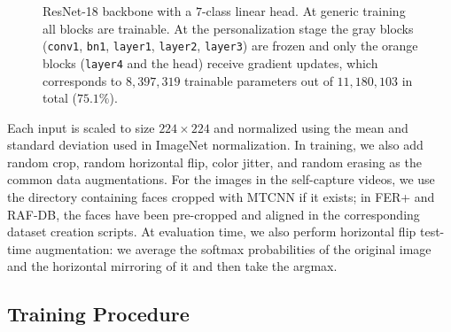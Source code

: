 \documentclass[12pt,a4paper]{article}
\begin{document}
\begin{figure}[H]
  \centering
  \caption{\footnotesize ResNet-18 backbone with a $7$-class linear head. At
  generic training all blocks are trainable. At the
  personalization stage the gray blocks
  (\texttt{conv1}, \texttt{bn1}, \texttt{layer1},
  \texttt{layer2}, \texttt{layer3}) are frozen and only the
  orange blocks (\texttt{layer4} and the head) receive gradient
  updates, which corresponds to $8{,}397{,}319$ trainable
  parameters out of $11{,}180{,}103$ in total ($75.1\%$).}
  \label{fig:arch}
\end{figure}

Each input is scaled to size $224 \times 224$ and normalized
using the mean and standard deviation used in ImageNet
normalization. In training, we also add random crop, random
horizontal flip, color jitter, and random erasing as the common
data augmentations. For the images in the self-capture videos,
we use the directory containing faces cropped with MTCNN if it
exists; in FER+ and RAF-DB, the faces have been pre-cropped and
aligned in the corresponding dataset creation scripts. At
evaluation time, we also perform horizontal flip test-time
augmentation: we average the softmax probabilities of the
original image and the horizontal mirroring of it and then take
the argmax.

\subsection{Training Procedure}
\label{sec:impl:training}
\end{document}
